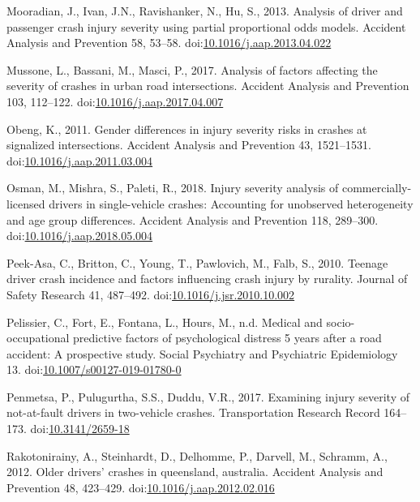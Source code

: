 \documentclass[]{elsarticle} %
\begin{document}
\leavevmode\hypertarget{ref-Mooradian2013analysis}{}%
Mooradian, J., Ivan, J.N., Ravishanker, N., Hu, S., 2013. Analysis of
driver and passenger crash injury severity using partial proportional
odds models. Accident Analysis and Prevention 58, 53--58.
doi:\href{https://doi.org/10.1016/j.aap.2013.04.022}{10.1016/j.aap.2013.04.022}

\leavevmode\hypertarget{ref-Mussone2017analysis}{}%
Mussone, L., Bassani, M., Masci, P., 2017. Analysis of factors affecting
the severity of crashes in urban road intersections. Accident Analysis
and Prevention 103, 112--122.
doi:\href{https://doi.org/10.1016/j.aap.2017.04.007}{10.1016/j.aap.2017.04.007}

\leavevmode\hypertarget{ref-Obeng2011gender}{}%
Obeng, K., 2011. Gender differences in injury severity risks in crashes
at signalized intersections. Accident Analysis and Prevention 43,
1521--1531.
doi:\href{https://doi.org/10.1016/j.aap.2011.03.004}{10.1016/j.aap.2011.03.004}

\leavevmode\hypertarget{ref-Osman2018injury}{}%
Osman, M., Mishra, S., Paleti, R., 2018. Injury severity analysis of
commercially-licensed drivers in single-vehicle crashes: Accounting for
unobserved heterogeneity and age group differences. Accident Analysis
and Prevention 118, 289--300.
doi:\href{https://doi.org/10.1016/j.aap.2018.05.004}{10.1016/j.aap.2018.05.004}

\leavevmode\hypertarget{ref-Peek-Asa2010teenage}{}%
Peek-Asa, C., Britton, C., Young, T., Pawlovich, M., Falb, S., 2010.
Teenage driver crash incidence and factors influencing crash injury by
rurality. Journal of Safety Research 41, 487--492.
doi:\href{https://doi.org/10.1016/j.jsr.2010.10.002}{10.1016/j.jsr.2010.10.002}

\leavevmode\hypertarget{ref-Pelissier2019medical}{}%
Pelissier, C., Fort, E., Fontana, L., Hours, M., n.d. Medical and
socio-occupational predictive factors of psychological distress 5 years
after a road accident: A prospective study. Social Psychiatry and
Psychiatric Epidemiology 13.
doi:\href{https://doi.org/10.1007/s00127-019-01780-0}{10.1007/s00127-019-01780-0}

\leavevmode\hypertarget{ref-Penmetsa2017examining}{}%
Penmetsa, P., Pulugurtha, S.S., Duddu, V.R., 2017. Examining injury
severity of not-at-fault drivers in two-vehicle crashes. Transportation
Research Record 164--173.
doi:\href{https://doi.org/10.3141/2659-18}{10.3141/2659-18}

\leavevmode\hypertarget{ref-Rakotonirainy2012older}{}%
Rakotonirainy, A., Steinhardt, D., Delhomme, P., Darvell, M., Schramm,
A., 2012. Older drivers' crashes in queensland, australia. Accident
Analysis and Prevention 48, 423--429.
doi:\href{https://doi.org/10.1016/j.aap.2012.02.016}{10.1016/j.aap.2012.02.016}
\end{document}

